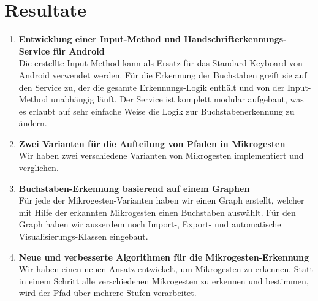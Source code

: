 \chapter{Resultate}

\begin{enumerate}
\item \textbf{Entwicklung einer Input-Method und Handschrifterkennungs-Service für Android} \\ 
Die erstellte Input-Method kann als Ersatz für das Standard-Keyboard von Android verwendet werden. Für die Erkennung der Buchstaben greift sie auf den Service zu, der die gesamte Erkennungs-Logik enthält und von der Input-Method unabhängig läuft.
Der Service ist komplett modular aufgebaut, was es erlaubt auf sehr einfache Weise die Logik zur Buchstabenerkennung zu ändern.

\item \textbf{Zwei Varianten für die Aufteilung von Pfaden in Mikrogesten} \\
Wir haben zwei verschiedene Varianten von Mikrogesten implementiert und verglichen. 

\item \textbf{Buchstaben-Erkennung basierend auf einem Graphen} \\
Für jede der Mikrogesten-Varianten haben wir einen Graph erstellt, welcher mit Hilfe der erkannten Mikrogesten einen Buchstaben auswählt. Für den Graph haben wir ausserdem noch Import-, Export- und automatische Visualisierungs-Klassen eingebaut.

\item \textbf{Neue und verbesserte Algorithmen für die Mikrogesten-Erkennung} \\
Wir haben einen neuen Ansatz entwickelt, um Mikrogesten zu erkennen. Statt in einem Schritt alle verschiedenen Mikrogesten zu erkennen und bestimmen, wird der Pfad über mehrere Stufen verarbeitet. 

\end{enumerate}
